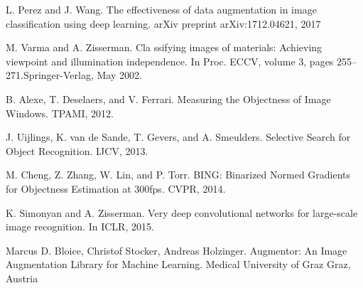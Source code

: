 \documentclass[12pt]{report}
\begin{document}
\begin{thebibliography}{9}
			L. Perez and J. Wang. The effectiveness of data augmentation in image classification using deep learning. arXiv preprint arXiv:1712.04621, 2017
															
			M. Varma and A. Zisserman. Cla	ssifying images of materials: Achieving viewpoint and illumination independence. In Proc. ECCV, volume 3, pages 255–271.Springer-Verlag, May 2002.	
																		
			B. Alexe, T. Deselaers, and V. Ferrari. Measuring the Objectness of Image Windows. TPAMI, 2012.
															
			J. Uijlings, K. van de Sande, T. Gevers, and A. Smeulders. Selective Search for Object Recognition. IJCV, 2013.
															
			M. Cheng, Z. Zhang, W. Lin, and P. Torr. BING: Binarized Normed Gradients for Objectness Estimation at 300fps. CVPR, 2014.
															
			K. Simonyan and A. Zisserman. Very deep convolutional networks for large-scale image recognition. In ICLR, 2015.
															
			Marcus D. Bloice, Christof Stocker, Andreas Holzinger. Augmentor: An Image Augmentation Library for Machine Learning. Medical University of Graz Graz, Austria
															
															
		\end{thebibliography}
																								
\end{document}

